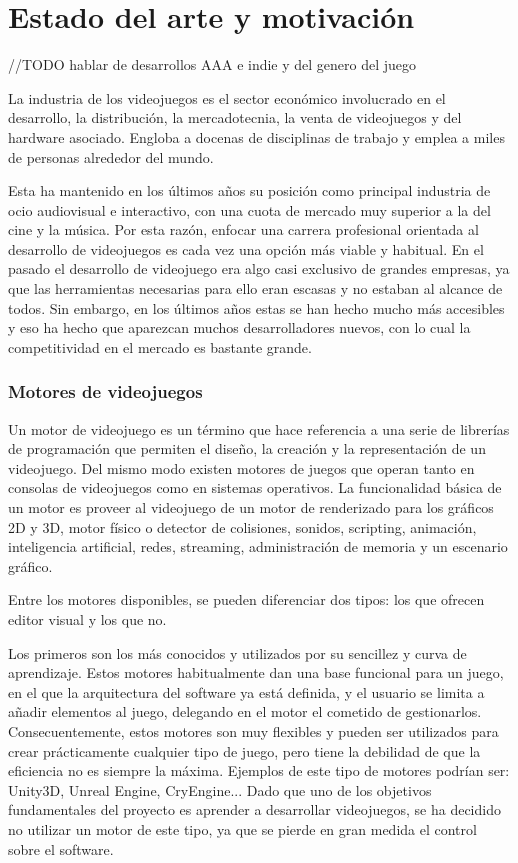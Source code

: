 	\section{Estado del arte y motivación}

		//TODO hablar de desarrollos AAA e indie y del genero del juego

		La industria de los videojuegos es el sector económico involucrado en el desarrollo, la distribución, la mercadotecnia, la venta de videojuegos y del hardware asociado. Engloba a docenas de disciplinas de trabajo y emplea a miles de personas alrededor del mundo.

		Esta ha mantenido en los últimos años su posición como principal industria de ocio audiovisual e interactivo, con una cuota de mercado muy superior a la del cine y la música. Por esta razón, enfocar una carrera profesional orientada al desarrollo de videojuegos es cada vez una opción más viable y habitual. En el pasado el desarrollo de videojuego era algo casi exclusivo de grandes empresas, ya que las herramientas necesarias para ello eran escasas y no estaban al alcance de todos. Sin embargo, en los últimos años estas se han hecho mucho más accesibles y eso ha hecho que aparezcan muchos desarrolladores nuevos, con lo cual la competitividad en el mercado es bastante grande.

		\subsubsection{Motores de videojuegos}

			Un motor de videojuego es un término que hace referencia a una serie de librerías de programación que permiten el diseño, la creación y la representación de un videojuego. Del mismo modo existen motores de juegos que operan tanto en consolas de videojuegos como en sistemas operativos. La funcionalidad básica de un motor es proveer al videojuego de un motor de renderizado para los gráficos 2D y 3D, motor físico o detector de colisiones, sonidos, scripting, animación, inteligencia artificial, redes, streaming, administración de memoria y un escenario gráfico.

			Entre los motores disponibles, se pueden diferenciar dos tipos: los que ofrecen editor visual y los que no.

			Los primeros son los más conocidos y utilizados por su sencillez y curva de aprendizaje. Estos motores habitualmente dan una base funcional para un juego, en el que la arquitectura del software ya está definida, y el usuario se limita a añadir elementos al juego, delegando en el motor el cometido de gestionarlos. Consecuentemente, estos motores son muy flexibles y pueden ser utilizados para crear prácticamente cualquier tipo de juego, pero tiene la debilidad de que la eficiencia no es siempre la máxima. Ejemplos de este tipo de motores podrían ser: Unity3D, Unreal Engine, CryEngine... Dado que uno de los objetivos fundamentales del proyecto es aprender a desarrollar videojuegos, se ha decidido no utilizar un motor de este tipo, ya que se pierde en gran medida el control sobre el software.

